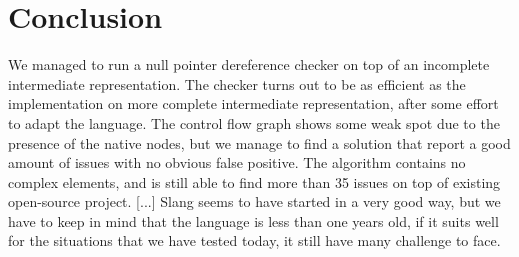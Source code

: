 \section{Conclusion}
\label{sec:conclusion}
We managed to run a null pointer dereference checker on top of an incomplete intermediate representation. 
The checker turns out to be as efficient as the implementation on more complete intermediate representation, after some effort to adapt the language. 
The control flow graph shows some weak spot due to the presence of the native nodes, but we manage to find a solution that report a good amount of issues with no obvious false positive. 
The algorithm contains no complex elements, and is still able to find more than 35 issues on top of existing open-source project.
[...]
Slang seems to have started in a very good way, but we have to keep in mind that the language is less than one years old, if it suits well for the situations that we have tested today, it still have many challenge to face.
